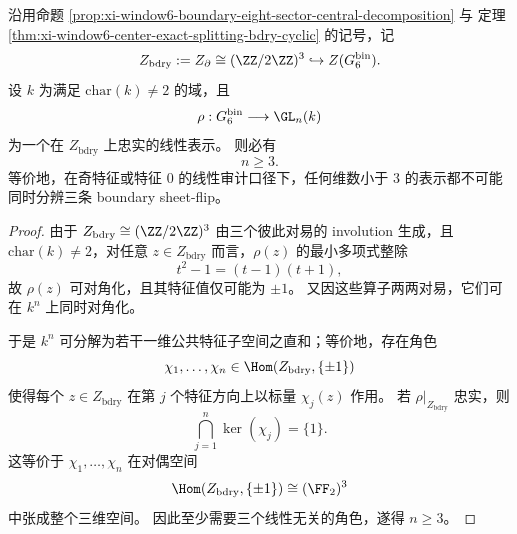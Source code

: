 \begin{theorem}\label{thm:xi-window6-boundary-minimal-linear-visible-dimension}
沿用命题 \ref{prop:xi-window6-boundary-eight-sector-central-decomposition} 与
定理 \ref{thm:xi-window6-center-exact-splitting-bdry-cyclic} 的记号，记
\[
Z_{\mathrm{bdry}}:=Z_{\partial}\cong (\ZZ/2\ZZ)^3
\hookrightarrow Z(G_6^{\mathrm{bin}}).
\]
设 \(k\) 为满足 \(\mathrm{char}(k)\neq 2\) 的域，且
\[
\rho:G_6^{\mathrm{bin}}\longrightarrow \GL_n(k)
\]
为一个在 \(Z_{\mathrm{bdry}}\) 上忠实的线性表示。
则必有
\[
n\ge 3.
\]
等价地，在奇特征或特征 \(0\) 的线性审计口径下，任何维数小于 \(3\) 的表示都不可能同时分辨三条 boundary sheet-flip。
\end{theorem}
\begin{proof}
由于 \(Z_{\mathrm{bdry}}\cong (\ZZ/2\ZZ)^3\) 由三个彼此对易的 involution 生成，且 \(\mathrm{char}(k)\neq 2\)，对任意 \(z\in Z_{\mathrm{bdry}}\) 而言，\(\rho(z)\) 的最小多项式整除
\[
t^2-1=(t-1)(t+1),
\]
故 \(\rho(z)\) 可对角化，且其特征值仅可能为 \(\pm 1\)。
又因这些算子两两对易，它们可在 \(k^n\) 上同时对角化。

于是 \(k^n\) 可分解为若干一维公共特征子空间之直和；等价地，存在角色
\[
\chi_1,\dots,\chi_n\in \Hom(Z_{\mathrm{bdry}},\{\pm 1\})
\]
使得每个 \(z\in Z_{\mathrm{bdry}}\) 在第 \(j\) 个特征方向上以标量 \(\chi_j(z)\) 作用。
若 \(\rho|_{Z_{\mathrm{bdry}}}\) 忠实，则
\[
\bigcap_{j=1}^{n}\ker(\chi_j)=\{1\}.
\]
这等价于 \(\chi_1,\dots,\chi_n\) 在对偶空间
\[
\Hom(Z_{\mathrm{bdry}},\{\pm 1\})
\cong (\FF_2)^3
\]
中张成整个三维空间。
因此至少需要三个线性无关的角色，遂得 \(n\ge 3\)。
\end{proof}

